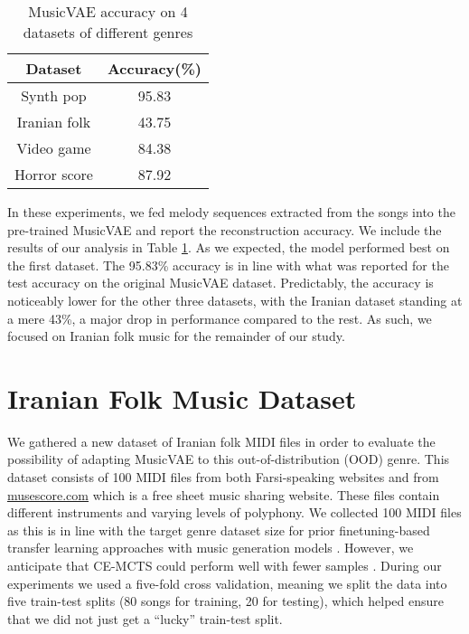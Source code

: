 \documentclass[letterpaper]{article}
\begin{document}
\begin{table}[tb]
    \centering
    \begin{tabular}{|c|c|}
    \hline
    Dataset & Accuracy(\%) \\
    \hline\hline
    Synth pop & 95.83 \\
    \hline
    Iranian folk & 43.75 \\
    \hline
    Video game & 84.38 \\
    \hline
    Horror score & 87.92 \\
    \hline
    \end{tabular}
    \caption{MusicVAE accuracy on 4 datasets of different genres}
    \label{table:4Genre}
\end{table}

In these experiments, we fed melody sequences extracted from the songs into the pre-trained MusicVAE and report the reconstruction accuracy.
We include the results of our analysis in Table \ref{table:4Genre}.
As we expected, the model performed best on the first dataset.
The 95.83\% accuracy is in line with what was reported for the test accuracy on the original MusicVAE dataset. 
Predictably, the accuracy is noticeably lower for the other three datasets, with the Iranian dataset standing at a mere 43\%, a major drop in performance compared to the rest. 
As such, we focused on Iranian folk music for the remainder of our study.

\section{Iranian Folk Music Dataset} \label{data}   
We gathered a new dataset of Iranian folk MIDI files in order to evaluate the possibility of adapting MusicVAE to this out-of-distribution (OOD) genre.
This dataset consists of 100 MIDI files from both Farsi-speaking websites and from \url{musescore.com} which is a free sheet music sharing website. These files contain different instruments and varying levels of polyphony. 
We collected 100 MIDI files as this is in line with the target genre dataset size for prior finetuning-based transfer learning approaches with music generation models \cite{svegliato2016deep,marchetti2021convolutional}. 
However, we anticipate that CE-MCTS could perform well with fewer samples \cite{Mahajan2023}.
During our experiments we used a five-fold cross validation, meaning we split the data into five train-test splits (80 songs for training, 20 for testing), which helped ensure that we did not just get a ``lucky'' train-test split.
\end{document}
